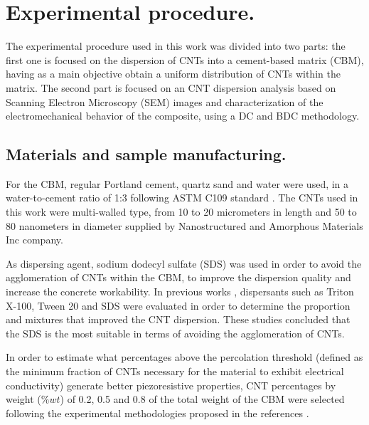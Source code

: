 \documentclass[twocolumn]{bmcart}%
\begin{document}
\section{Experimental procedure.}

The experimental procedure used in this work was divided into two parts: the first one is focused on the dispersion of CNTs into a cement-based matrix (CBM), having as a main objective obtain a uniform distribution of CNTs within the matrix. The second part is focused on an CNT dispersion analysis based on Scanning Electron Microscopy (SEM) images and characterization of the electromechanical behavior of the composite, using a  DC and BDC methodology. 

\subsection{Materials and sample manufacturing.}

For the CBM, regular Portland cement, quartz sand and water were used, in a water-to-cement ratio of 1:3 following ASTM C109 standard \cite{ASTMC1092000}. The CNTs used in this work were multi-walled type, from 10 to 20 micrometers in length and 50 to 80 nanometers in diameter supplied by Nanostructured and Amorphous Materials Inc company.

As dispersing agent, sodium dodecyl sulfate (SDS) was used in order to avoid the agglomeration of CNTs within the CBM, to improve the dispersion quality and increase the concrete workability. In previous works \cite{Castaneda-Saldarriaga2019, Kyrylyuk2008, Shao2017, Myung2014, Sasmal2017, Rehman2018}, dispersants such as Triton X-100, Tween 20 and SDS were evaluated in order to determine the proportion and mixtures that improved the CNT dispersion. These studies concluded that the SDS is the most suitable in terms of avoiding the agglomeration of CNTs.

In order to estimate what percentages above the percolation threshold (defined as the minimum fraction of CNTs necessary for the material to exhibit electrical conductivity) generate better piezoresistive properties, CNT percentages by weight ($\%wt$) of 0.2, 0.5 and 0.8 of the total weight of the CBM were selected following the experimental methodologies proposed in the references \cite{Coppola2011, Downey2017a, Cui2013, Garcia-Macias2017, Baeza2013a, Yoo2018a}. 
\end{document}
